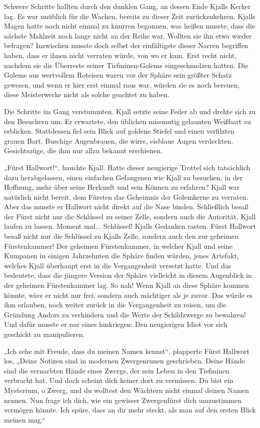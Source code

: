 \documentclass[10pt, a4paper, oneside]{book}
\begin{document}
Schwere Schritte hallten durch den dunklen Gang, an dessen Ende Kjalls Kerker lag. Es war unüblich für die Wachen, bereits zu dieser Zeit zurückzukehren. Kjalls Magen hatte noch nicht einmal zu knurren begonnen, was heißen musste, dass die nächste Mahlzeit noch lange nicht an der Reihe war. Wollten sie ihn etwa wieder befragen? Inzwischen musste doch selbst der einfältigste dieser Narren begriffen haben, dass er ihnen nicht verraten würde, von wo er kam. Erst recht nicht, nachdem sie die Überreste seiner Tiefminen-Golems eingeschmolzen hatten. Die Golems aus wertvollem Roteisen waren vor der Sphäre sein größter Schatz gewesen, und wenn er hier erst einmal raus war, würden sie es noch bereuen, diese Meisterwerke nicht als solche geachtet zu haben.

Die Schritte im Gang verstummten. Kjall setzte seine Feder ab und drehte sich zu den Besuchern um. Er erwartete, den üblichen missmutig gelaunten Weißbart zu erblicken. Stattdessen fiel sein Blick auf goldene Stiefel und einen verfilzten grauen Bart. Buschige Augenbrauen, die wirre, eisblaue Augen verdeckten. Gesichtszüge, die ihm nur allzu bekannt erschienen.

„Fürst Hallwort!“, hauchte Kjall. Hatte dieser neugierige Trottel sich tatsächlich dazu herabgelassen, einen einfachen Gefangenen wie Kjall zu besuchen, in der Hoffnung, mehr über seine Herkunft und sein Können zu erfahren? Kjall war natürlich nicht bereit, dem Fürsten das Geheimnis der Golemkerne zu verraten. Aber das musste er Hallwort nicht direkt auf die Nase binden. Schließlich besaß der Fürst nicht nur die Schlüssel zu seiner Zelle, sondern auch die Autorität, Kjall laufen zu lassen. Moment mal... Schlüssel! Kjalls Gedanken rasten. Fürst Hallwort besaß nicht nur die Schlüssel zu Kjalls Zelle, sondern auch den zur geheimen Fürstenkammer! Der geheimen Fürstenkammer, in welcher Kjall und seine Kumpanen in einigen Jahrzehnten die Sphäre finden würden, jenes Artefakt, welches Kjall überhaupt erst in die Vergangenheit versetzt hatte. Und das bedeutete, dass die jüngere Version der Sphäre vielleicht in diesem Augenblick in der geheimen Fürstenkammer lag. So nah! Wenn Kjall an diese Sphäre kommen könnte, wäre er nicht nur frei, sondern auch mächtiger als je zuvor. Das würde es ihm erlauben, noch weiter zurück in die Vergangenheit zu reisen, um die Gründung Andors zu verhindern und die Werte der Schildzwerge zu bewahren! Und dafür musste er nur eines hinkriegen: Den neugierigen Idiot vor sich geschickt zu manipulieren.

„Ich sehe mit Freude, dass du meinen Namen kennst“, plapperte Fürst Hallwort los, „Deine Notizen sind in modernen Zwergenrunen geschrieben. Deine Hände sind die vernarbten Hände eines Zwergs, der sein Leben in den Tiefminen verbracht hat. Und doch scheint dich keiner dort zu vermissen. Du bist ein Mysterium, o Zwerg, und du wolltest den Wächtern nicht einmal deinen Namen nennen. Nun frage ich dich, wie ein gewisser Zwergenfürst dich umzustimmen vermögen könnte. Ich spüre, dass an dir mehr steckt, als man auf den ersten Blick meinen mag.“
\end{document}
